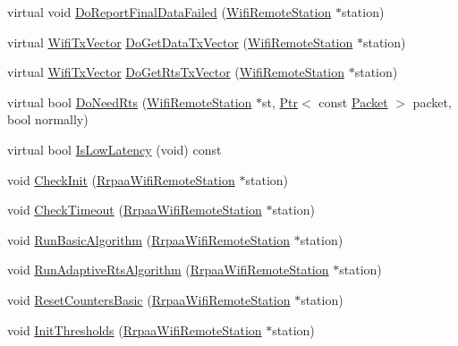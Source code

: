 \begin{DoxyCompactItemize}
\item 
virtual void \hyperlink{classns3_1_1RrpaaWifiManager_adf06bcf1e7dc7fb02f536fa3df601d83}{Do\+Report\+Final\+Data\+Failed} (\hyperlink{structns3_1_1WifiRemoteStation}{Wifi\+Remote\+Station} $\ast$station)
\item 
virtual \hyperlink{classns3_1_1WifiTxVector}{Wifi\+Tx\+Vector} \hyperlink{classns3_1_1RrpaaWifiManager_add26dac79b43d5c0114ba30e8cb29a9e}{Do\+Get\+Data\+Tx\+Vector} (\hyperlink{structns3_1_1WifiRemoteStation}{Wifi\+Remote\+Station} $\ast$station)
\item 
virtual \hyperlink{classns3_1_1WifiTxVector}{Wifi\+Tx\+Vector} \hyperlink{classns3_1_1RrpaaWifiManager_ae174e676f819aa2337f06d21408d007c}{Do\+Get\+Rts\+Tx\+Vector} (\hyperlink{structns3_1_1WifiRemoteStation}{Wifi\+Remote\+Station} $\ast$station)
\item 
virtual bool \hyperlink{classns3_1_1RrpaaWifiManager_a948105f3b3d0129bb717091b004dda38}{Do\+Need\+Rts} (\hyperlink{structns3_1_1WifiRemoteStation}{Wifi\+Remote\+Station} $\ast$st, \hyperlink{classns3_1_1Ptr}{Ptr}$<$ const \hyperlink{classns3_1_1Packet}{Packet} $>$ packet, bool normally)
\item 
virtual bool \hyperlink{classns3_1_1RrpaaWifiManager_a255e1cef6d8f103cca7821488da74e6c}{Is\+Low\+Latency} (void) const 
\item 
void \hyperlink{classns3_1_1RrpaaWifiManager_a37fd1f9711566d9def5f31c966a89bb5}{Check\+Init} (\hyperlink{structns3_1_1RrpaaWifiRemoteStation}{Rrpaa\+Wifi\+Remote\+Station} $\ast$station)
\item 
void \hyperlink{classns3_1_1RrpaaWifiManager_acec84b5339d6c92c97e70829014610be}{Check\+Timeout} (\hyperlink{structns3_1_1RrpaaWifiRemoteStation}{Rrpaa\+Wifi\+Remote\+Station} $\ast$station)
\item 
void \hyperlink{classns3_1_1RrpaaWifiManager_afe9476e03ce4922dc3a72efd28cd795e}{Run\+Basic\+Algorithm} (\hyperlink{structns3_1_1RrpaaWifiRemoteStation}{Rrpaa\+Wifi\+Remote\+Station} $\ast$station)
\item 
void \hyperlink{classns3_1_1RrpaaWifiManager_a7d6e86c0478fac977e85a7548cb058e1}{Run\+Adaptive\+Rts\+Algorithm} (\hyperlink{structns3_1_1RrpaaWifiRemoteStation}{Rrpaa\+Wifi\+Remote\+Station} $\ast$station)
\item 
void \hyperlink{classns3_1_1RrpaaWifiManager_a09b0daa8aa5414f393f6b8fb2a3043ca}{Reset\+Counters\+Basic} (\hyperlink{structns3_1_1RrpaaWifiRemoteStation}{Rrpaa\+Wifi\+Remote\+Station} $\ast$station)
\item 
void \hyperlink{classns3_1_1RrpaaWifiManager_aec4722912f34f11418471ba80d37f3d2}{Init\+Thresholds} (\hyperlink{structns3_1_1RrpaaWifiRemoteStation}{Rrpaa\+Wifi\+Remote\+Station} $\ast$station)

\end{DoxyCompactItemize}
